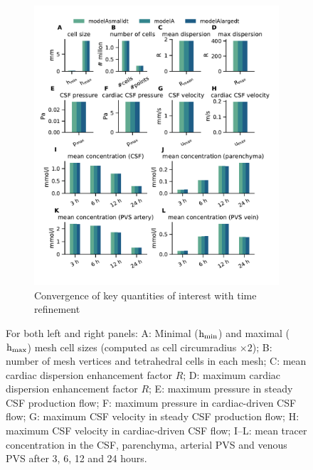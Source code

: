 \documentclass[fleqn,10pt]{wlscirep}
\begin{document}
\begin{figure}
\begin{subfigure}[b]{0.49\textwidth}
     \includegraphics[trim={0.5cm 1cm 0.05cm 0.8cm}, clip,width= 1.05 \linewidth]{figures/modelAsmalldt_modelA_modelAlargedt.pdf}
        \caption*{Convergence of key quantities of interest with time refinement}
    \end{subfigure}
    \caption{For both left and right panels: A: Minimal ($\rm h_{min}$) and maximal ($\rm h_{max}$) mesh cell sizes (computed as cell circumradius $\times 2$); B: number of mesh vertices and tetrahedral cells in each mesh; C: mean cardiac dispersion enhancement factor $R$; D: maximum cardiac dispersion enhancement factor $R$; E: maximum pressure in steady CSF production flow; F: maximum pressure in cardiac-driven CSF flow; G: maximum CSF velocity in steady CSF production flow; H: maximum CSF velocity in cardiac-driven CSF flow; I--L: mean tracer concentration in the CSF, parenchyma, arterial PVS and venous PVS after 3, 6, 12 and 24 hours.}
        \label{fig:mesh_time_convergence}
\end{figure}
\end{document}
